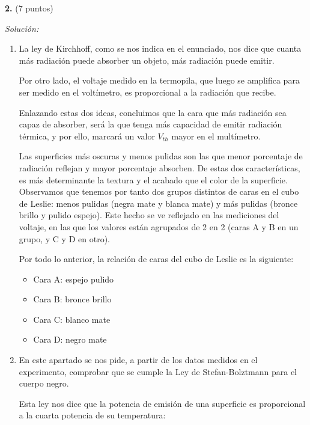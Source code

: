 \textbf{2.} (7 puntos)

\vspace{20px}
\textit{Solución:}
\\

\begin{enumerate}
[label=\alph*)]
    \item La ley de Kirchhoff, como se nos indica en el enunciado, nos dice que cuanta más radiación puede absorber un objeto, más radiación puede emitir.

    Por otro lado, el voltaje medido en la termopila, que luego se amplifica para ser medido en el voltímetro, es proporcional a la radiación que recibe.

    Enlazando estas dos ideas, concluimos que la cara que más radiación sea capaz de absorber, será la que tenga más capacidad de emitir radiación térmica, y por ello,
    marcará un valor $V_{th}$ mayor en el multímetro.

    Las superficies más oscuras y menos pulidas son las que menor porcentaje de radiación reflejan y mayor porcentaje absorben.
    De estas dos características, es más determinante la textura y el acabado que el color de la superficie. Observamos que tenemos
    por tanto dos grupos distintos de caras en el cubo de Leslie: menos pulidas (negra mate y blanca mate) y más pulidas (bronce brillo y pulido espejo).
    Este hecho se ve reflejado en las mediciones del voltaje, en las que los valores están agrupados de 2 en 2 (caras A y B en un grupo, y C y D en otro).

    Por todo lo anterior, la relación de caras del cubo de Leslie es la siguiente:
    \begin{itemize}
        \item Cara A: espejo pulido
        \item Cara B: bronce brillo
        \item Cara C: blanco mate
        \item Cara D: negro mate
    \end{itemize}


    \vspace{20px}
    \item En este apartado se nos pide, a partir de los datos medidos en el experimento, comprobar que se cumple la Ley de Stefan-Bolztmann
    para el cuerpo negro.

    Esta ley nos dice que la potencia de emisión de una superficie es proporcional a la cuarta potencia de su temperatura:


\end{enumerate}
